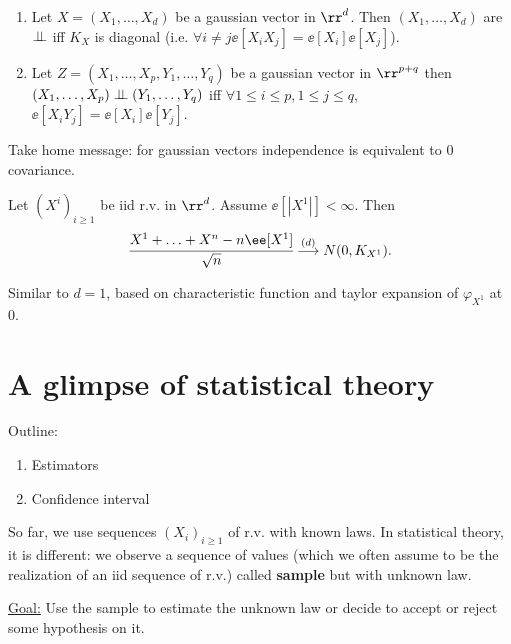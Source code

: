 \documentclass[../main.tex]{subfiles}
\begin{document}
\begin{theorem}
  \hfill
  \vspace{-2em}

    \begin{enumerate}
      \item Let $X = (X_1,\ldots,X_d)$ be a gaussian vector in $\rr^d$. Then
        $(X_1, \ldots, X_d)$ are $\perp\!\!\!\!\,\perp$ iff $K_X$ is diagonal (i.e. $\forall i
        \neq j \ee[X_i X_j] = \ee[X_i]\ee[X_j]$).
      \item Let $Z = (X_1,\ldots, X_p, Y_1,\ldots, Y_q)$ be a gaussian vector in
        $\rr^{p+q}$ then $(X_1, \ldots, X_p) \perp\!\!\!\!\,\perp (Y_1, \ldots, Y_q)$ iff
        $\forall 1 \leq i \leq p, 1 \leq j \leq q$, $\ee[X_i Y_j] = \ee[X_i]
        \ee[Y_j]$.
    \end{enumerate}
\end{theorem}
Take home message: for gaussian vectors independence is equivalent to $0$
covariance.

\begin{theorem}
  Let $(X^i)_{i \geq 1}$ be iid r.v. in $\rr^d$. Assume $\ee[|X^1|] < \infty$.
  Then 
  \[
    \cfrac{X^1 + \ldots + X^n - n \ee[X^1]}{\sqrt{n}}
    \overset{(d)}{\longrightarrow} N(0, K_{X^1})
  .\] 
\end{theorem}
\begin{sketch}
    Similar to $d = 1$, based on characteristic function and taylor expansion of
    $\varphi_{X^1}$ at $0$.
\end{sketch}

\section{A glimpse of statistical theory}

Outline: 
\begin{enumerate}
  \item Estimators
  \item Confidence interval
\end{enumerate}

So far, we use sequences $(X_i)_{i \geq 1}$ of r.v. with known laws. In
statistical theory, it is different: we observe a sequence of values (which we
often assume to be the realization of an iid sequence of r.v.) called
\textbf{sample} but with unknown law.

\underline{\sffamily Goal:} Use the sample to estimate the unknown law or decide
to accept or reject some hypothesis on it.
\end{document}

